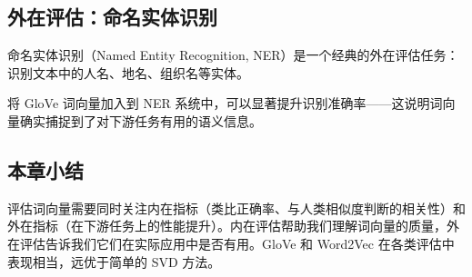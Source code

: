 \subsection{外在评估：命名实体识别}

命名实体识别（Named Entity Recognition, NER）是一个经典的外在评估任务：识别文本中的人名、地名、组织名等实体。

将 GloVe 词向量加入到 NER 系统中，可以显著提升识别准确率——这说明词向量确实捕捉到了对下游任务有用的语义信息。

\subsection{本章小结}

评估词向量需要同时关注内在指标（类比正确率、与人类相似度判断的相关性）和外在指标（在下游任务上的性能提升）。内在评估帮助我们理解词向量的质量，外在评估告诉我们它们在实际应用中是否有用。GloVe 和 Word2Vec 在各类评估中表现相当，远优于简单的 SVD 方法。


